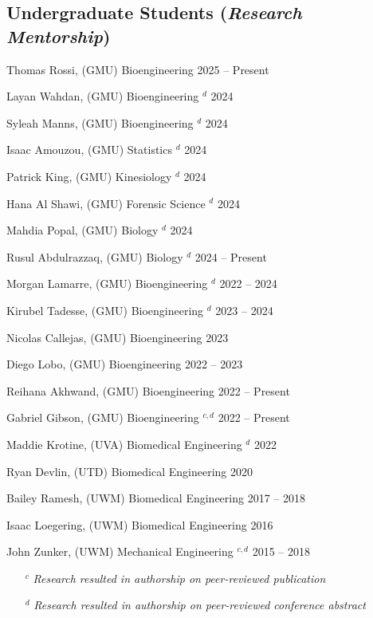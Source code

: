 \documentclass[letterpaper, 10pt]{article}
\begin{document}
\subsection{\textbf{Undergraduate Students} (\textit{Research Mentorship})}
\begin{compacthang}
     \item Thomas Rossi, (GMU) Bioengineering \hfill 2025 -- Present
     \item Layan Wahdan, (GMU) Bioengineering $^{d}$ \hfill 2024
     \item Syleah Manns, (GMU) Bioengineering $^{d}$ \hfill 2024
     \item Isaac Amouzou, (GMU) Statistics $^{d}$ \hfill 2024
     \item Patrick King, (GMU) Kinesiology $^{d}$ \hfill 2024
     \item Hana Al Shawi, (GMU) Forensic Science $^{d}$ \hfill 2024
     \item Mahdia Popal, (GMU) Biology $^{d}$ \hfill 2024
     \item Rusul Abdulrazzaq, (GMU) Biology $^{d}$ \hfill 2024 -- Present
     \item Morgan Lamarre, (GMU) Bioengineering $^{d}$ \hfill 2022 -- 2024
	\item Kirubel Tadesse, (GMU) Bioengineering $^{d}$ \hfill 2023 -- 2024
	\item Nicolas Callejas, (GMU) Bioengineering \hfill 2023
	\item Diego Lobo, (GMU) Bioengineering  \hfill 2022 -- 2023
     \item Reihana Akhwand, (GMU) Bioengineering \hfill 2022 -- Present
	\item Gabriel Gibson, (GMU) Bioengineering $^{c,d}$ \hfill 2022 -- Present
	\item Maddie Krotine, (UVA) Biomedical Engineering $^{d}$ \hfill 2022
	\item Ryan Devlin, (UTD) Biomedical Engineering \hfill 2020
	\item Bailey Ramesh, (UWM) Biomedical Engineering \hfill 2017 -- 2018
	\item Isaac Loegering, (UWM) Biomedical Engineering \hfill 2016
	\item John Zunker, (UWM) Mechanical Engineering $^{c,d}$ \hfill 2015 -- 2018 
     \begin{itemize}
	     \item[$^{c}$] \textit{\small Research resulted in authorship on peer-reviewed publication}
	     \item[$^{d}$] \textit{\small Research resulted in authorship on peer-reviewed conference abstract}
     \end{itemize}	
\end{compacthang}
\end{document}
